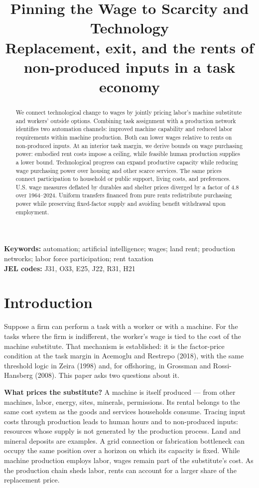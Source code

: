 \documentclass[12pt]{article}
\title{\bfseries Pinning the Wage to Scarcity and Technology\\[7pt]
  \large\mdseries Replacement, exit, and the rents of non-produced inputs in a task economy}
\author{}
\date{}
\theoremstyle{plain}
\begin{document}
\maketitle

\begin{abstract}
\noindent We connect technological change to wages by jointly pricing labor's machine substitute and workers' outside options. Combining task assignment with a production network identifies two automation channels: improved machine capability and reduced labor requirements within machine production. Both can lower wages relative to rents on non-produced inputs. At an interior task margin, we derive bounds on wage purchasing power: embodied rent costs impose a ceiling, while feasible human production supplies a lower bound. Technological progress can expand productive capacity while reducing wage purchasing power over housing and other scarce services. The same prices connect participation to household or public support, living costs, and preferences. U.S. wage measures deflated by durables and shelter prices diverged by a factor of 4.8 over 1964--2024. Uniform transfers financed from pure rents redistribute purchasing power while preserving fixed-factor supply and avoiding benefit withdrawal upon employment.
\end{abstract}

\noindent\textbf{Keywords:} automation; artificial intelligence; wages; land rent; production networks; labor force participation; rent taxation\\
\textbf{JEL codes:} J31, O33, E25, J22, R31, H21

\section{Introduction}\label{sec:1}

Suppose a firm can perform a task with a worker or with a machine. For the tasks where the firm is indifferent, the worker's wage is tied to the cost of the machine substitute. That mechanism is established: it is the factor-price condition at the task margin in Acemoglu and Restrepo (2018), with the same threshold logic in Zeira (1998) and, for offshoring, in Grossman and Rossi-Hansberg (2008). This paper asks two questions about it.

\textbf{What prices the substitute?} A machine is itself produced --- from other machines, labor, energy, sites, minerals, permissions. Its rental belongs to the same cost system as the goods and services households consume. Tracing input costs through production leads to human hours and to non-produced inputs: resources whose supply is not generated by the production process. Land and mineral deposits are examples. A grid connection or fabrication bottleneck can occupy the same position over a horizon on which its capacity is fixed. While machine production employs labor, wages remain part of the substitute's cost. As the production chain sheds labor, rents can account for a larger share of the replacement price.
\end{document}
